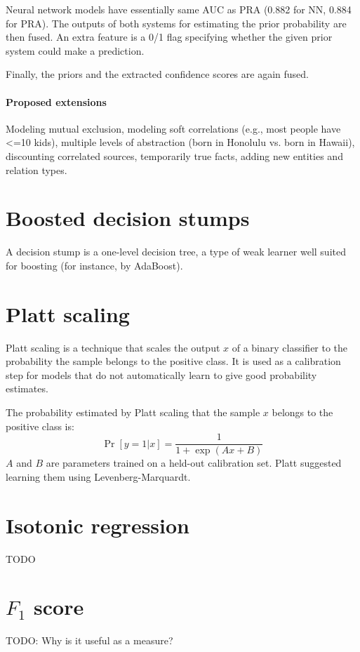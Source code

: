 Neural network models have essentially same AUC as PRA
(0.882 for NN, 0.884 for PRA).
The outputs of both systems for estimating the prior probability are then
fused. An extra feature is a 0/1 flag specifying whether the given prior system
could make a prediction.

Finally, the priors and the extracted confidence scores are again fused.

\paragraph{Proposed extensions}
Modeling mutual exclusion, modeling soft correlations
(e.g., most people have <=10 kids), multiple levels of abstraction (born in
Honolulu vs. born in Hawaii), discounting correlated sources, temporarily true
facts, adding new entities and relation types.

\section{Boosted decision stumps}
\label{boosted-decision-stumps}
A decision stump is a one-level decision tree, a type of weak learner
well suited for boosting (for instance, by AdaBoost).

\section{Platt scaling}
\label{platt-scaling}

Platt scaling\cite{platt-scaling} is a technique that scales the output $x$ of a binary classifier
to the probability the sample belongs to the positive class. It is used as a
calibration step for models that do not automatically learn to give good
probability estimates.

The probability estimated by Platt scaling that the sample $x$ belongs to the
positive class is:
$$\Pr[y=1|x] = \frac{1}{1+\exp(Ax+B)}$$
$A$ and $B$ are parameters trained on a held-out calibration set.
Platt suggested learning them using Levenberg-Marquardt.

\section{Isotonic regression}
TODO

\section{$F_1$ score}
\label{f-1}
TODO: Why is it useful as a measure?

